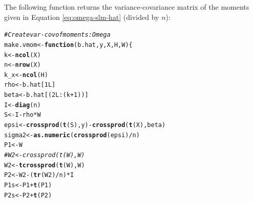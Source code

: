 \documentclass[english,12pt]{book}\usepackage[]{graphicx}\usepackage[]{xcolor}
\makeatletter
\newcommand{\hlnum}[1]{\textcolor[rgb]{0.686,0.059,0.569}{#1}}%
\newcommand{\hlcom}[1]{\textcolor[rgb]{0.678,0.584,0.686}{\textit{#1}}}%
\newcommand{\hlopt}[1]{\textcolor[rgb]{0,0,0}{#1}}%
\newcommand{\hlstd}[1]{\textcolor[rgb]{0.345,0.345,0.345}{#1}}%
\newcommand{\hlkwa}[1]{\textcolor[rgb]{0.161,0.373,0.58}{\textbf{#1}}}%
\newcommand{\hlkwb}[1]{\textcolor[rgb]{0.69,0.353,0.396}{#1}}%
\newcommand{\hlkwc}[1]{\textcolor[rgb]{0.333,0.667,0.333}{#1}}%
\newcommand{\hlkwd}[1]{\textcolor[rgb]{0.737,0.353,0.396}{\textbf{#1}}}%
\newenvironment{kframe}{%
 \def\at@end@of@kframe{}%
 \ifinner\ifhmode%
  \def\at@end@of@kframe{\end{minipage}}%
  \begin{minipage}{\columnwidth}%
 \fi\fi%
 \def\FrameCommand##1{\hskip\@totalleftmargin \hskip-\fboxsep
 \colorbox{shadecolor}{##1}\hskip-\fboxsep
     \hskip-\linewidth \hskip-\@totalleftmargin \hskip\columnwidth}%
 \MakeFramed {\advance\hsize-\width
   \@totalleftmargin\z@ \linewidth\hsize
   \@setminipage}}%
 {\par\unskip\endMakeFramed%
 \at@end@of@kframe}
\newenvironment{knitrout}{}{} %
\makeatother
\begin{document}
The following function returns the variance-covariance matrix of the moments given in Equation \eqref{eq:omega-slm-hat} (divided by $n$):
\begin{knitrout}
\color{fgcolor}\begin{kframe}
\begin{alltt}
\hlcom{# Create var-cov of moments: Omega}
\hlstd{make.vmom} \hlkwb{<-} \hlkwa{function}\hlstd{(}\hlkwc{b.hat}\hlstd{,} \hlkwc{y}\hlstd{,} \hlkwc{X}\hlstd{,} \hlkwc{H}\hlstd{,} \hlkwc{W}\hlstd{)\{}
  \hlstd{k}        \hlkwb{<-} \hlkwd{ncol}\hlstd{(X)}
  \hlstd{n}        \hlkwb{<-} \hlkwd{nrow}\hlstd{(X)}
  \hlstd{k_x}      \hlkwb{<-} \hlkwd{ncol}\hlstd{(H)}
  \hlstd{rho}      \hlkwb{<-} \hlstd{b.hat[}\hlnum{1L}\hlstd{]}
  \hlstd{beta}     \hlkwb{<-} \hlstd{b.hat[(}\hlnum{2L}\hlopt{:}\hlstd{(k} \hlopt{+} \hlnum{1}\hlstd{))]}
  \hlstd{I}        \hlkwb{<-} \hlkwd{diag}\hlstd{(n)}
  \hlstd{S}        \hlkwb{<-} \hlstd{I} \hlopt{-}  \hlstd{rho} \hlopt{*} \hlstd{W}
  \hlstd{epsi}     \hlkwb{<-} \hlkwd{crossprod}\hlstd{(}\hlkwd{t}\hlstd{(S), y)} \hlopt{-} \hlkwd{crossprod}\hlstd{(}\hlkwd{t}\hlstd{(X), beta)}
  \hlstd{sigma2}   \hlkwb{<-} \hlkwd{as.numeric}\hlstd{(}\hlkwd{crossprod}\hlstd{(epsi)} \hlopt{/} \hlstd{n)}
  \hlstd{P1}       \hlkwb{<-} \hlstd{W}
  \hlcom{#W2       <- crossprod(t(W), W)}
  \hlstd{W2}       \hlkwb{<-} \hlkwd{tcrossprod}\hlstd{(}\hlkwd{t}\hlstd{(W), W)}
  \hlstd{P2}       \hlkwb{<-} \hlstd{W2} \hlopt{-} \hlstd{(}\hlkwd{tr}\hlstd{(W2)} \hlopt{/} \hlstd{n)} \hlopt{*} \hlstd{I}
  \hlstd{P1s}      \hlkwb{<-} \hlstd{P1} \hlopt{+} \hlkwd{t}\hlstd{(P1)}
  \hlstd{P2s}      \hlkwb{<-} \hlstd{P2} \hlopt{+} \hlkwd{t}\hlstd{(P2)}


\end{alltt}
\end{kframe}
\end{knitrout}
\end{document}
